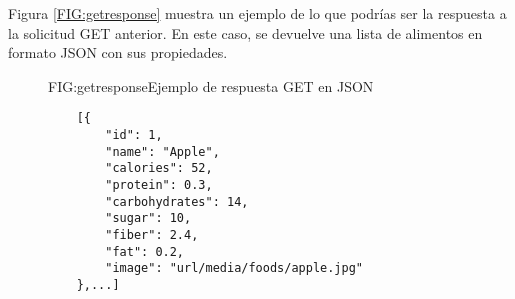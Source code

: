 Figura \ref{FIG:getresponse} muestra un ejemplo de lo que podrías ser la respuesta a la solicitud GET anterior. En este caso, se devuelve una lista de alimentos en formato JSON con sus propiedades.

\begin{figure}[Ejemplo Respuesta GET]{FIG:getresponse}{Ejemplo de respuesta GET en JSON}
\begin{verbatim}
    [{
        "id": 1,
        "name": "Apple",
        "calories": 52,
        "protein": 0.3,
        "carbohydrates": 14,
        "sugar": 10,
        "fiber": 2.4,
        "fat": 0.2,
        "image": "url/media/foods/apple.jpg"
    },...]
\end{verbatim}
\end{figure}